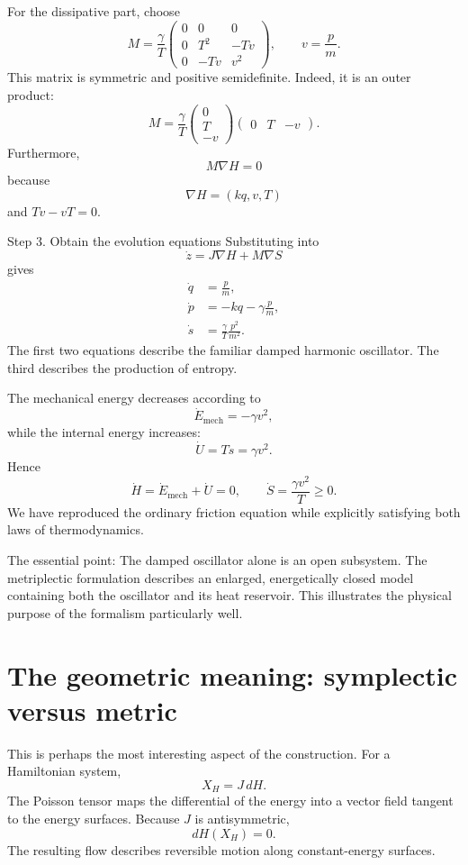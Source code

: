 For the dissipative part, choose
\[
\boxed{
M=\frac{\gamma}{T}
\begin{pmatrix}
0&0&0\\
0&T^2&-Tv\\
0&-Tv&v^2
\end{pmatrix},
\qquad v=\frac pm.
}
\]
This matrix is symmetric and positive semidefinite. Indeed, it is an outer product:
\[
M=\frac{\gamma}{T}
\begin{pmatrix}0\\T\\-v\end{pmatrix}
\begin{pmatrix}0&T&-v\end{pmatrix}.
\]
Furthermore,
\[
M\nabla H=0
\]
because
\[
\nabla H=(kq,v,T)
\]
and \(Tv-vT=0\).

Step 3. Obtain the evolution equations
Substituting into
\[
\dot z=J\nabla H+M\nabla S
\]
gives
\[
\boxed{
\begin{aligned}
\dot q&=\frac pm,\\
\dot p&=-kq-\gamma\frac pm,\\
\dot s&=\frac{\gamma}{T}\frac{p^2}{m^2}.
\end{aligned}
}
\]
The first two equations describe the familiar damped harmonic oscillator.
The third describes the production of entropy.

The mechanical energy decreases according to
\[
\dot E_{\mathrm{mech}}=-\gamma v^2,
\]
while the internal energy increases:
\[
\dot U=T\dot s=\gamma v^2.
\]
Hence
\[
\boxed{
\dot H=\dot E_{\mathrm{mech}}+\dot U=0,
\qquad
\dot S=\frac{\gamma v^2}{T}\geq0.
}
\]
We have reproduced the ordinary friction equation while explicitly satisfying
both laws of thermodynamics.

The essential point: The damped oscillator alone is an open subsystem. The
metriplectic formulation describes an enlarged, energetically closed model
containing both the oscillator and its heat reservoir.
This illustrates the physical purpose of the formalism particularly well.

\section{The geometric meaning: symplectic versus metric}
This is perhaps the most interesting aspect of the construction.
For a Hamiltonian system,
\[
X_H=J\,dH.
\]
The Poisson tensor maps the differential of the energy into a vector field
tangent to the energy surfaces.
Because \(J\) is antisymmetric,
\[
dH(X_H)=0.
\]
The resulting flow describes reversible motion along constant-energy surfaces.

